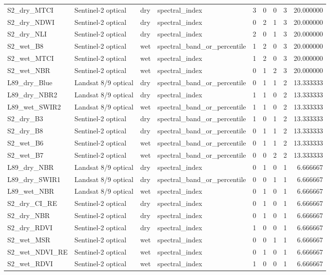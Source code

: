 \begin{tabular}{llllrrrrr}
S2_dry_MTCI & Sentinel-2 optical & dry & spectral_index & 3 & 0 & 0 & 3 & 20.000000 \\
S2_dry_NDWI & Sentinel-2 optical & dry & spectral_index & 0 & 2 & 1 & 3 & 20.000000 \\
S2_dry_NLI & Sentinel-2 optical & dry & spectral_index & 2 & 0 & 1 & 3 & 20.000000 \\
S2_wet_B8 & Sentinel-2 optical & wet & spectral_band_or_percentile & 1 & 2 & 0 & 3 & 20.000000 \\
S2_wet_MTCI & Sentinel-2 optical & wet & spectral_index & 1 & 2 & 0 & 3 & 20.000000 \\
S2_wet_NBR & Sentinel-2 optical & wet & spectral_index & 0 & 1 & 2 & 3 & 20.000000 \\
L89_dry_Blue & Landsat 8/9 optical & dry & spectral_band_or_percentile & 0 & 1 & 1 & 2 & 13.333333 \\
L89_dry_NBR2 & Landsat 8/9 optical & dry & spectral_index & 1 & 1 & 0 & 2 & 13.333333 \\
L89_wet_SWIR2 & Landsat 8/9 optical & wet & spectral_band_or_percentile & 1 & 1 & 0 & 2 & 13.333333 \\
S2_dry_B3 & Sentinel-2 optical & dry & spectral_band_or_percentile & 1 & 0 & 1 & 2 & 13.333333 \\
S2_dry_B8 & Sentinel-2 optical & dry & spectral_band_or_percentile & 0 & 1 & 1 & 2 & 13.333333 \\
S2_wet_B6 & Sentinel-2 optical & wet & spectral_band_or_percentile & 0 & 1 & 1 & 2 & 13.333333 \\
S2_wet_B7 & Sentinel-2 optical & wet & spectral_band_or_percentile & 0 & 0 & 2 & 2 & 13.333333 \\
L89_dry_NBR & Landsat 8/9 optical & dry & spectral_index & 0 & 1 & 0 & 1 & 6.666667 \\
L89_dry_SWIR1 & Landsat 8/9 optical & dry & spectral_band_or_percentile & 0 & 0 & 1 & 1 & 6.666667 \\
L89_wet_NBR & Landsat 8/9 optical & wet & spectral_index & 0 & 1 & 0 & 1 & 6.666667 \\
S2_dry_CI_RE & Sentinel-2 optical & dry & spectral_index & 0 & 1 & 0 & 1 & 6.666667 \\
S2_dry_NBR & Sentinel-2 optical & dry & spectral_index & 0 & 1 & 0 & 1 & 6.666667 \\
S2_dry_RDVI & Sentinel-2 optical & dry & spectral_index & 1 & 0 & 0 & 1 & 6.666667 \\
S2_wet_MSR & Sentinel-2 optical & wet & spectral_index & 0 & 0 & 1 & 1 & 6.666667 \\
S2_wet_NDVI_RE & Sentinel-2 optical & wet & spectral_index & 0 & 1 & 0 & 1 & 6.666667 \\
S2_wet_RDVI & Sentinel-2 optical & wet & spectral_index & 1 & 0 & 0 & 1 & 6.666667 \\
\bottomrule
\end{tabular}
